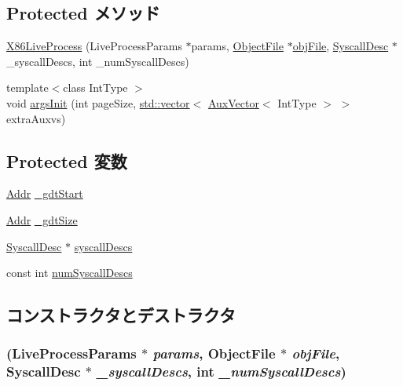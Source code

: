 \subsection*{Protected メソッド}
\begin{DoxyCompactItemize}
\item 
\hyperlink{classX86ISA_1_1X86LiveProcess_a6a12433fc14d1afa3744abbe3c019b7b}{X86LiveProcess} (LiveProcessParams $\ast$params, \hyperlink{classObjectFile}{ObjectFile} $\ast$\hyperlink{classLiveProcess_ab6cfcfa7903c66267b3e0351c3caa809}{objFile}, \hyperlink{classSyscallDesc}{SyscallDesc} $\ast$\_\-syscallDescs, int \_\-numSyscallDescs)
\item 
{\footnotesize template$<$class IntType $>$ }\\void \hyperlink{classX86ISA_1_1X86LiveProcess_ac7876453870f7620e67298b48c3ec93c}{argsInit} (int pageSize, \hyperlink{classstd_1_1vector}{std::vector}$<$ \hyperlink{structAuxVector}{AuxVector}$<$ IntType $>$ $>$ extraAuxvs)
\end{DoxyCompactItemize}
\subsection*{Protected 変数}
\begin{DoxyCompactItemize}
\item 
\hyperlink{base_2types_8hh_af1bb03d6a4ee096394a6749f0a169232}{Addr} \hyperlink{classX86ISA_1_1X86LiveProcess_ac5ecf9d163642401bfbd3a3c123e7588}{\_\-gdtStart}
\item 
\hyperlink{base_2types_8hh_af1bb03d6a4ee096394a6749f0a169232}{Addr} \hyperlink{classX86ISA_1_1X86LiveProcess_a758d088d5e01acff75151eb6b1fd4a16}{\_\-gdtSize}
\item 
\hyperlink{classSyscallDesc}{SyscallDesc} $\ast$ \hyperlink{classX86ISA_1_1X86LiveProcess_a36d3cbdd5c6e5a64542256b84b0fa0c3}{syscallDescs}
\item 
const int \hyperlink{classX86ISA_1_1X86LiveProcess_ae08bf33f0aaf2f6045ed37acbe0779c8}{numSyscallDescs}
\end{DoxyCompactItemize}


\subsection{コンストラクタとデストラクタ}
\hypertarget{classX86ISA_1_1X86LiveProcess_a6a12433fc14d1afa3744abbe3c019b7b}{
\subsubsection[{X86LiveProcess}]{ (LiveProcessParams $\ast$ {\em params}, \/  {\bf ObjectFile} $\ast$ {\em objFile}, \/  {\bf SyscallDesc} $\ast$ {\em \_\-syscallDescs}, \/  int {\em \_\-numSyscallDescs})}}
\label{classX86ISA_1_1X86LiveProcess_a6a12433fc14d1afa3744abbe3c019b7b}



